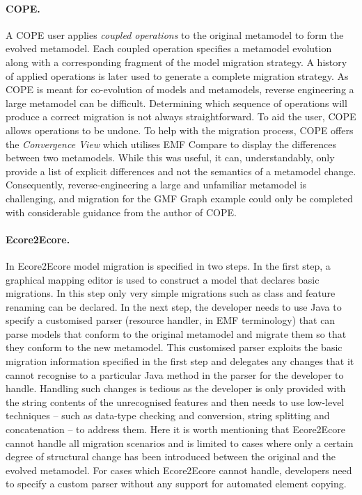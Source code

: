 \paragraph{COPE.} A COPE user applies \emph{coupled operations} to the original metamodel to form the evolved metamodel. Each coupled operation specifies a metamodel evolution along with a corresponding fragment of the model migration strategy. A history of applied operations is later used to generate a complete migration strategy.
%
As COPE is meant for co-evolution of models and metamodels, reverse engineering a large metamodel can be difficult. Determining which sequence of operations will produce a correct migration is not always straightforward. To aid the user, COPE allows operations to be undone.
%
To help with the migration process, COPE offers the \emph{Convergence View} which utilises EMF Compare to display the differences between two metamodels. While this was useful, it can, understandably, only provide a list of explicit differences and not the semantics of a metamodel change. Consequently, reverse-engineering a large and unfamiliar metamodel is challenging, and migration for the GMF Graph example could only be completed with considerable guidance from the author of COPE. %

\paragraph{Ecore2Ecore.} In Ecore2Ecore model migration is specified in two steps. In the first step, a graphical mapping editor is used to construct a model that declares basic migrations. In this step only very simple migrations such as class and feature renaming can be declared. In the next step, the developer needs to use Java to specify a customised parser (resource handler, in EMF terminology) that can parse models that conform to the original metamodel and migrate them so that they conform to the new metamodel. This customised parser exploits the basic migration information specified in the first step and delegates any changes that it cannot recognise to a particular Java method in the parser for the developer to handle. Handling such changes is tedious as the developer is only provided with the string contents of the unrecognised features and then needs to use low-level techniques -- such as data-type checking and conversion, string splitting and concatenation -- to address them. Here it is worth mentioning that Ecore2Ecore cannot handle all migration scenarios and is limited to cases where only a certain degree of structural change has been introduced between the original and the evolved metamodel. For cases which Ecore2Ecore cannot handle, developers need to specify a custom parser without any support for automated element copying.

